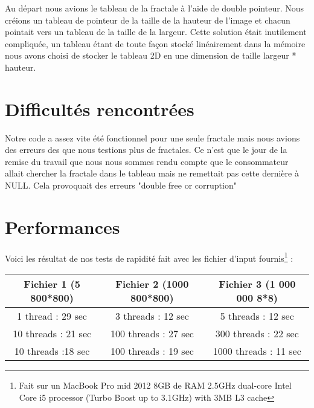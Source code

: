 \documentclass[10pt,a4paper]{article}
\begin{document}
Au départ nous avions le tableau de la fractale à l'aide de double pointeur.
Nous créions un tableau de pointeur de la taille de la hauteur de l'image et chacun pointait vers un tableau de la taille de la largeur.
Cette solution était inutilement compliquée, un tableau étant de toute façon stocké linéairement dans la mémoire nous avons choisi de stocker le tableau 2D en une dimension de taille largeur * hauteur.

\section{Difficultés rencontrées}

Notre code a assez vite été fonctionnel pour une seule fractale mais nous avions des erreurs des que nous testions plus de fractales. Ce n'est que le jour de la remise du travail que nous nous sommes rendu compte que le consommateur allait chercher la fractale dans le tableau mais ne remettait pas cette dernière à NULL. Cela provoquait des erreurs "double free or corruption" 

\section{Performances}


Voici les résultat de nos tests de rapidité fait avec les fichier d'input fournis\footnote{Fait sur un MacBook Pro mid 2012 8GB de RAM 2.5GHz dual-core Intel Core i5 processor (Turbo Boost up to 3.1GHz) with 3MB L3 cache} : 

\begin{tabular}{|c|c|c|}
 \hline 
 Fichier 1 (5 800*800) & Fichier 2 (1000 800*800) & Fichier 3 (1 000 000 8*8) \\ 
 \hline 
 1 thread : 29 sec & 3 threads : 12 sec & 5 threads : 12 sec \\ 
 \hline 
 10 threads : 21 sec & 100 threads : 27 sec & 300 threads : 22 sec\\ 
 \hline 
 10 threads :18 sec  & 100 threads : 19 sec & 1000 threads : 11 sec\\ 
 \hline
 \end{tabular}  
\end{document}
